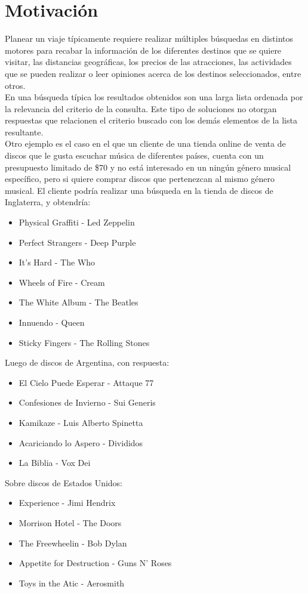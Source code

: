 \section{Motivación}
Planear un viaje típicamente requiere realizar múltiples búsquedas en distintos motores para recabar la información de los diferentes destinos que se quiere visitar, las distancias geográficas, los precios de las atracciones, las actividades que se pueden realizar o leer opiniones acerca de los destinos seleccionados, entre otros.\\
En una búsqueda típica los resultados obtenidos son una larga lista ordenada por la relevancia del criterio de la consulta. Este tipo de soluciones no otorgan respuestas que relacionen el criterio buscado con los demás elementos de la lista resultante.\\
Otro ejemplo es el caso en el que un cliente de una tienda online de venta de discos que le gusta escuchar música de diferentes países, cuenta con un presupuesto limitado de \$70 y no está interesado en un ningún género musical específico, pero si quiere comprar discos que pertenezcan al mismo género musical. El cliente podría realizar una búsqueda en la tienda de discos de Inglaterra, y obtendría:
\begin{itemize}
  \item Physical Graffiti - Led Zeppelin
  \item Perfect Strangers - Deep Purple
  \item It's Hard - The Who 
  \item Wheels of Fire - Cream
  \item The White Album - The Beatles
  \item Innuendo - Queen
  \item Sticky Fingers - The Rolling Stones
\end{itemize}
Luego de discos de Argentina, con respuesta:
\begin{itemize}
  \item El Cielo Puede Esperar - Attaque 77
  \item Confesiones de Invierno - Sui Generis
  \item Kamikaze - Luis Alberto Spinetta
  \item Acariciando lo Aspero - Divididos
  \item La Biblia - Vox Dei
\end{itemize} 
Sobre discos de Estados Unidos:
\begin{itemize}	
	\item Experience - Jimi Hendrix
	\item Morrison Hotel - The Doors
	\item The Freewheelin - Bob Dylan
	\item Appetite for Destruction - Guns N' Roses
	\item Toys in the Atic - Aerosmith
\end{itemize}
